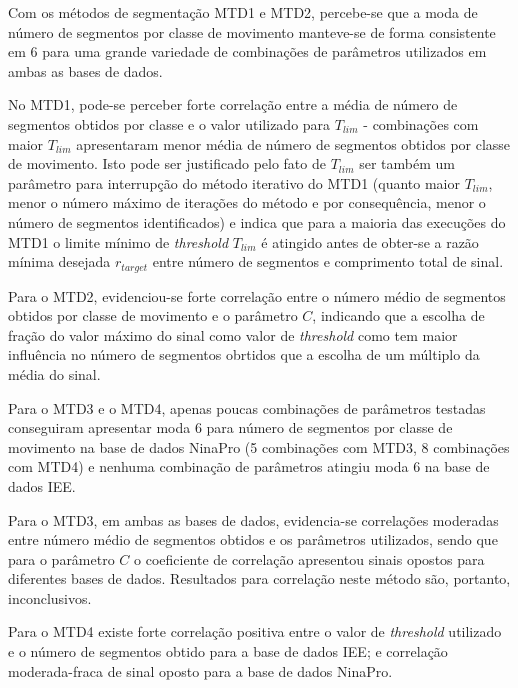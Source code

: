  

Com os métodos de segmentação MTD1 e MTD2, percebe-se que a moda de número de segmentos por classe de movimento manteve-se de forma consistente em 6 para uma grande variedade de combinações de parâmetros utilizados em ambas as bases de dados.

No MTD1, pode-se perceber forte correlação entre a média de número de segmentos obtidos por classe e o valor utilizado para $T_{lim}$ - combinações com maior $T_{lim}$ apresentaram menor média de número de segmentos obtidos por classe de movimento. Isto pode ser justificado pelo fato de $T_{lim}$ ser também um parâmetro para interrupção do método iterativo do MTD1 (quanto maior $T_{lim}$, menor o número máximo de iterações do método e por consequência, menor o número de segmentos identificados) e indica que para a maioria das execuções do MTD1 o limite mínimo de \emph{threshold} $T_{lim}$ é atingido antes de obter-se a razão mínima desejada $r_{target}$ entre número de segmentos e comprimento total de sinal.

Para o MTD2, evidenciou-se forte correlação entre o número médio de segmentos obtidos por classe de movimento e o parâmetro $C$, indicando que a escolha de fração do valor máximo do sinal como valor de \emph{threshold} como tem maior influência no número de segmentos obrtidos que a escolha de um múltiplo da média do sinal.

Para o MTD3 e o MTD4, apenas poucas combinações de parâmetros testadas conseguiram apresentar moda 6 para número de segmentos por classe de movimento na base de dados NinaPro (5 combinações com MTD3, 8 combinações com MTD4) e nenhuma combinação de parâmetros atingiu moda 6 na base de dados IEE.

Para o MTD3, em ambas as bases de dados, evidencia-se correlações moderadas entre número médio de segmentos obtidos e os parâmetros utilizados, sendo que para o parâmetro $C$ o coeficiente de correlação apresentou sinais opostos para diferentes bases de dados. Resultados para correlação neste método são, portanto, inconclusivos.

Para o MTD4 existe forte correlação positiva entre o valor de \emph{threshold} utilizado e o número de segmentos obtido para a base de dados IEE; e correlação moderada-fraca de sinal oposto para a base de dados NinaPro.


